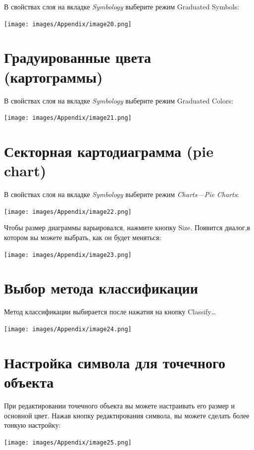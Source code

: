 \documentclass[12pt,]{book}
\begin{document}
В свойствах слоя на вкладке \emph{Symbology} выберите режим Graduated Symbols:

\texttt{[image: images/Appendix/image20.png]}

\hypertarget{manual-vector-graduated}{%
\section{Градуированные цвета (картограммы)}\label{manual-vector-graduated}}

В свойствах слоя на вкладке \emph{Symbology} выберите режим Graduated Colors:

\texttt{[image: images/Appendix/image21.png]}

\hypertarget{manual-vector-pie}{%
\section{Секторная картодиаграмма (pie chart)}\label{manual-vector-pie}}

В свойствах слоя на вкладке \emph{Symbology} выберите режим \emph{Charts---Pie Charts}:

\texttt{[image: images/Appendix/image22.png]}

Чтобы размер диаграммы варьировался, нажмите кнопку Size. Появится диалог,в котором вы можете выбрать, как он будет меняться:

\texttt{[image: images/Appendix/image23.png]}

\hypertarget{manual-vector-classes}{%
\section{Выбор метода классификации}\label{manual-vector-classes}}

Метод классификации выбирается после нажатия на кнопку Classify\ldots{}

\texttt{[image: images/Appendix/image24.png]}

\hypertarget{manual-vector-point}{%
\section{Настройка символа для точечного объекта}\label{manual-vector-point}}

При редактировании точечного объекта вы можете настраивать его размер и основной цвет. Нажав кнопку редактирования символа, вы можете сделать более тонкую настройку:

\texttt{[image: images/Appendix/image25.png]}
\end{document}
